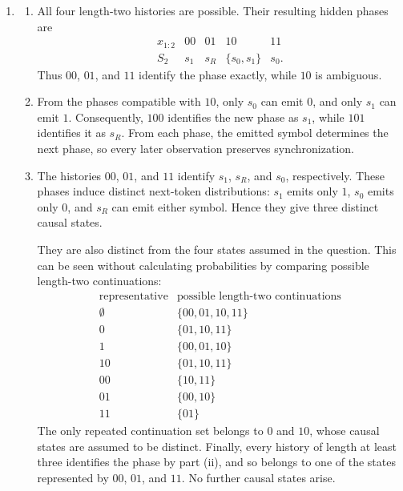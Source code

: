\documentclass[11pt]{article}
\begin{document}
\begin{solution}[ex:p2-3]
    \begin{enumerate}
      \item
        \begin{enumerate}
          \item All four length-two histories are possible. Their resulting
            hidden phases are
            \[
              \begin{array}{c|cccc}
                x_{1:2} & 00 & 01 & 10 & 11\\
                \hline
                S_2 & s_1 & s_R & \{s_0,s_1\} & s_0.
              \end{array}
            \]
            Thus $00$, $01$, and $11$ identify the phase exactly, while $10$
            is ambiguous.

          \item From the phases compatible with $10$, only $s_0$ can emit
            $0$, and only $s_1$ can emit $1$. Consequently, $100$ identifies
            the new phase as $s_1$, while $101$ identifies it as $s_R$. From
            each phase, the emitted symbol determines the next phase, so every
            later observation preserves synchronization.

          \item The histories $00$, $01$, and $11$ identify $s_1$, $s_R$,
            and $s_0$, respectively. These phases induce distinct next-token
            distributions: $s_1$ emits only $1$, $s_0$ emits only $0$, and
            $s_R$ can emit either symbol. Hence they give three distinct causal
            states.

            They are also distinct from the four states assumed in the
            question. This can be seen without calculating probabilities by
            comparing possible length-two continuations:
            \[
              \begin{array}{c|c}
                \text{representative} & \text{possible length-two continuations}\\
                \hline
                \emptyset & \{00,01,10,11\}\\
                0          & \{01,10,11\}\\
                1          & \{00,01,10\}\\
                10         & \{01,10,11\}\\
                00         & \{10,11\}\\
                01         & \{00,10\}\\
                11         & \{01\}
              \end{array}
            \]
            The only repeated continuation set belongs to $0$ and $10$, whose
            causal states are assumed to be distinct. Finally, every history
            of length at least three identifies the phase by part (ii), and so
            belongs to one of the states represented by $00$, $01$, and $11$.
            No further causal states arise.


\end{enumerate}
\end{enumerate}
\end{solution}
\end{document}
